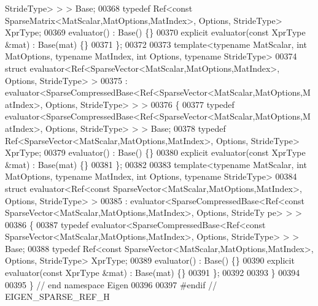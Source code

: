 \begin{DoxyCode}
      StrideType> > > Base;
00368   \textcolor{keyword}{typedef} Ref<const SparseMatrix<MatScalar,MatOptions,MatIndex>, Options, StrideType> XprType;  
00369   evaluator() : Base() \{\}
00370   \textcolor{keyword}{explicit} evaluator(\textcolor{keyword}{const} XprType &mat) : Base(mat) \{\}
00371 \};
00372 
00373 \textcolor{keyword}{template}<\textcolor{keyword}{typename} MatScalar, \textcolor{keywordtype}{int} MatOptions, \textcolor{keyword}{typename} MatIndex, \textcolor{keywordtype}{int} Options, \textcolor{keyword}{typename} Str\textcolor{keywordtype}{id}eType>
00374 \textcolor{keyword}{struct }evaluator<Ref<SparseVector<MatScalar,MatOptions,MatIndex>, Options, StrideType> >
00375   : evaluator<SparseCompressedBase<Ref<SparseVector<MatScalar,MatOptions,MatIndex>, Options, StrideType> > 
      >
00376 \{
00377   \textcolor{keyword}{typedef} evaluator<SparseCompressedBase<Ref<SparseVector<MatScalar,MatOptions,MatIndex>, Options, 
      StrideType> > > Base;
00378   \textcolor{keyword}{typedef} Ref<SparseVector<MatScalar,MatOptions,MatIndex>, Options, StrideType> XprType;
00379   evaluator() : Base() \{\}
00380   \textcolor{keyword}{explicit} evaluator(\textcolor{keyword}{const} XprType &mat) : Base(mat) \{\}
00381 \};
00382 
00383 \textcolor{keyword}{template}<\textcolor{keyword}{typename} MatScalar, \textcolor{keywordtype}{int} MatOptions, \textcolor{keyword}{typename} MatIndex, \textcolor{keywordtype}{int} Options, \textcolor{keyword}{typename} Str\textcolor{keywordtype}{id}eType>
00384 \textcolor{keyword}{struct }evaluator<Ref<const SparseVector<MatScalar,MatOptions,MatIndex>, Options, StrideType> >
00385   : evaluator<SparseCompressedBase<Ref<const SparseVector<MatScalar,MatOptions,MatIndex>, Options, StrideTy
      pe> > >
00386 \{
00387   \textcolor{keyword}{typedef} evaluator<SparseCompressedBase<Ref<const SparseVector<MatScalar,MatOptions,MatIndex>, Options, 
      StrideType> > > Base;
00388   \textcolor{keyword}{typedef} Ref<const SparseVector<MatScalar,MatOptions,MatIndex>, Options, StrideType> XprType;
00389   evaluator() : Base() \{\}
00390   \textcolor{keyword}{explicit} evaluator(\textcolor{keyword}{const} XprType &mat) : Base(mat) \{\}
00391 \};
00392 
00393 \}
00394 
00395 \} \textcolor{comment}{// end namespace Eigen}
00396 
00397 \textcolor{preprocessor}{#endif // EIGEN\_SPARSE\_REF\_H}
\end{DoxyCode}
